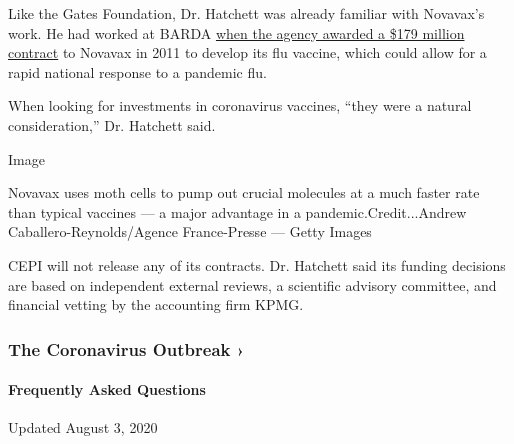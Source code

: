 Like the Gates Foundation, Dr. Hatchett was already familiar with
Novavax's work. He had worked at BARDA
\href{https://www.prnewswire.com/news-releases/novavax-awarded-hhs-barda-contract-valued-at-up-to-179-million-to-develop-pandemic-and-seasonal-influenza-vaccines-for-us-government-using-recombinant-vlp-technology-117145058.html}{when
the agency awarded a \$179 million contract} to Novavax in 2011 to
develop its flu vaccine, which could allow for a rapid national response
to a pandemic flu.

When looking for investments in coronavirus vaccines, ``they were a
natural consideration,'' Dr. Hatchett said.

Image

Novavax uses moth cells to pump out crucial molecules at a much faster
rate than typical vaccines --- a major advantage in a
pandemic.Credit...Andrew Caballero-Reynolds/Agence France-Presse ---
Getty Images

CEPI will not release any of its contracts. Dr. Hatchett said its
funding decisions are based on independent external reviews, a
scientific advisory committee, and financial vetting by the accounting
firm KPMG.

\href{https://www.nytimes3xbfgragh.onion/news-event/coronavirus?action=click\&pgtype=Article\&state=default\&region=MAIN_CONTENT_3\&context=storylines_faq}{}

\hypertarget{the-coronavirus-outbreak-}{%
\subsubsection{The Coronavirus Outbreak
›}\label{the-coronavirus-outbreak-}}

\hypertarget{frequently-asked-questions}{%
\paragraph{Frequently Asked
Questions}\label{frequently-asked-questions}}

Updated August 3, 2020

